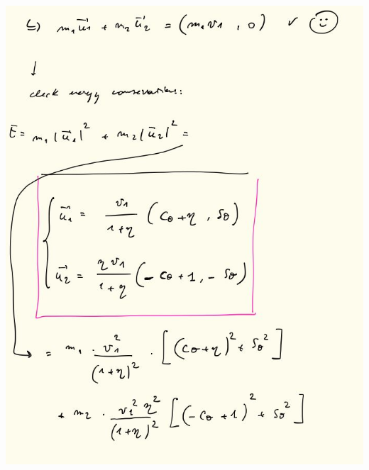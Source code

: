 \documentclass[fleqn]{article}
\begin{document}
\begin{center}
  \includegraphics[height=18.5cm, width=18cm]{9.JPG}
\end{center}

\pagebreak
\end{document}
